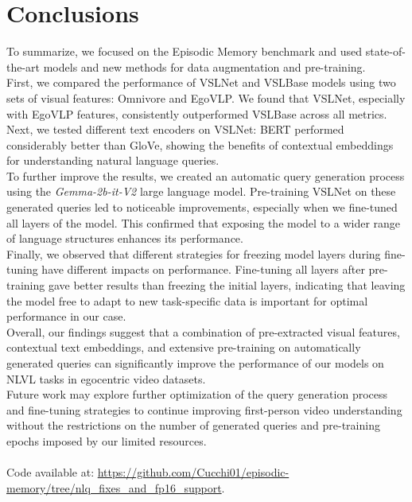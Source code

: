 \documentclass[10pt,twocolumn,letterpaper]{article}
\begin{document}
\section{Conclusions}
To summarize, we focused on the Episodic Memory benchmark and used state-of-the-art models and new methods for data augmentation and pre-training.\\
First, we compared the performance of VSLNet and VSLBase models using two sets of visual features: Omnivore and EgoVLP. We found that VSLNet, especially with EgoVLP features, consistently outperformed VSLBase across all metrics.\\
Next, we tested different text encoders on VSLNet: BERT performed considerably better than GloVe, showing the benefits of contextual embeddings for understanding natural language queries.\\
To further improve the results, we created an automatic query generation process using the \textit{Gemma-2b-it-V2} large language model. Pre-training VSLNet on these generated queries led to noticeable improvements, especially when we fine-tuned all layers of the model. This confirmed that exposing the model to a wider range of language structures enhances its performance.\\
Finally, we observed that different strategies for freezing model layers during fine-tuning have different impacts on performance.  Fine-tuning all layers after pre-training gave better results than freezing the initial layers, indicating that leaving the model free to adapt to new task-specific data is important for optimal performance in our case.\\
Overall, our findings suggest that a combination of pre-extracted visual features, contextual text embeddings, and extensive pre-training on automatically generated queries can significantly improve the performance of our models on NLVL tasks in egocentric video datasets.\\
Future work may explore further optimization of the query generation process and fine-tuning strategies to continue improving first-person video understanding without the restrictions on the number of generated queries and pre-training epochs imposed by our limited resources.\\\\
Code available at: \href{https://github.com/Cucchi01/episodic-memory/tree/nlq_fixes_and_fp16_support}{https://github.com/Cucchi01/episodic-memory/tree/nlq\_fixes\_and\_fp16\_support}.


{\small


}
\end{document}
